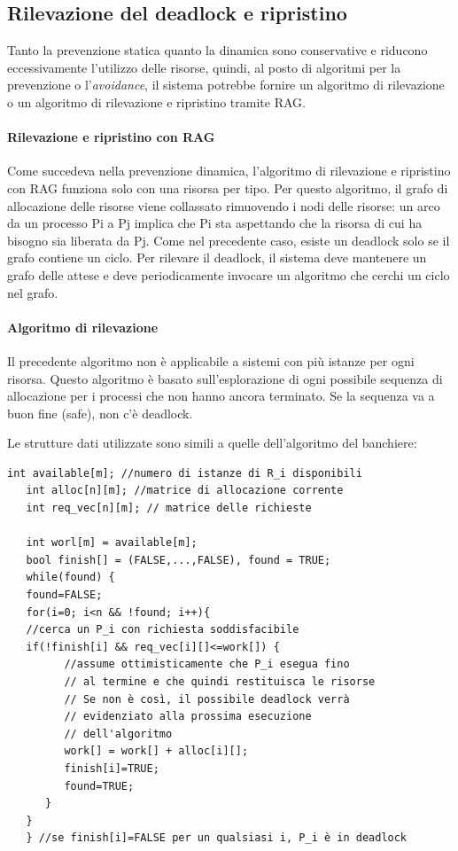 \documentclass[a4paper]{article}
\begin{document}
\subsection{Rilevazione del deadlock e ripristino}
Tanto la prevenzione statica quanto la dinamica sono conservative e riducono eccessivamente l'utilizzo delle risorse, quindi, al posto di algoritmi per la prevenzione o l'\textit{avoidance}, il sistema potrebbe fornire un algoritmo di rilevazione o un algoritmo di rilevazione e ripristino tramite RAG.

\paragraph{Rilevazione e ripristino con RAG}Come succedeva nella prevenzione dinamica, l'algoritmo di rilevazione e ripristino con RAG funziona solo con una risorsa per tipo. Per questo algoritmo, il grafo di allocazione delle risorse viene collassato rimuovendo i nodi delle risorse: un arco da un processo Pi a Pj implica che Pi sta aspettando che la risorsa di cui ha bisogno sia liberata da Pj. Come nel precedente caso, esiste un deadlock solo se il grafo contiene un ciclo. Per rilevare il deadlock, il sistema deve mantenere un grafo delle attese e deve periodicamente invocare un algoritmo che cerchi un ciclo nel grafo.

\paragraph{Algoritmo di rilevazione} Il precedente algoritmo non è applicabile a sistemi con più istanze per ogni risorsa. Questo algoritmo è basato sull'esplorazione di ogni possibile sequenza di allocazione per i processi che non hanno ancora terminato. Se la sequenza va a buon fine (safe), non c'è deadlock.

Le strutture dati utilizzate sono simili a quelle dell'algoritmo del banchiere:
\begin{Verbatim}[tabsize=3]
   int available[m]; //numero di istanze di R_i disponibili
   int alloc[n][m]; //matrice di allocazione corrente
   int req_vec[n][m]; // matrice delle richieste

   int worl[m] = available[m];
   bool finish[] = (FALSE,...,FALSE), found = TRUE;
   while(found) {
   found=FALSE;
   for(i=0; i<n && !found; i++){
   //cerca un P_i con richiesta soddisfacibile
   if(!finish[i] && req_vec[i][]<=work[]) {
         //assume ottimisticamente che P_i esegua fino
         // al termine e che quindi restituisca le risorse
         // Se non è così, il possibile deadlock verrà
         // evidenziato alla prossima esecuzione
         // dell'algoritmo
         work[] = work[] + alloc[i][];
         finish[i]=TRUE;
         found=TRUE;
      }
   }
   } //se finish[i]=FALSE per un qualsiasi i, P_i è in deadlock
\end{Verbatim}
\end{document}
